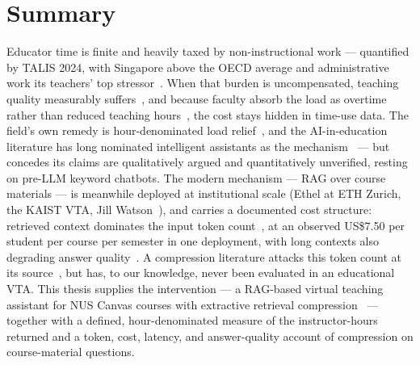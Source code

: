 \section{Summary}
\label{review:sec:summary}

Educator time is finite and heavily taxed by non-instructional work ---
quantified by TALIS 2024, with Singapore above the OECD average and
administrative work its teachers' top stressor~\cite{oecd25:TalisSG}. When
that burden is uncompensated, teaching quality measurably
suffers~\cite{apec15:GarciaGallego}, and because faculty absorb the load as
overtime rather than reduced teaching hours~\cite{wp07:Allgood}, the cost
stays hidden in time-use data. The field's own remedy is hour-denominated
load relief~\cite{aaup00:Workload}, and the AI-in-education literature has
long nominated intelligent assistants as the mechanism~\cite{sust22:Ahmad} ---
but concedes its claims are qualitatively argued and quantitatively
unverified, resting on pre-LLM keyword chatbots. The modern mechanism ---
RAG over course materials --- is meanwhile deployed at institutional scale
(Ethel at ETH Zurich, the KAIST VTA, Jill Watson~\cite{tpt24:Kortemeyer,
acl25:Kweon, arxiv24:JillWatson}), and carries a documented cost structure:
retrieved context dominates the input token count~\cite{femnlp23:Liu}, at an
observed US\$7.50 per student per course per semester in one deployment, with
long contexts also degrading answer quality~\cite{tacl24:Liu}. A compression
literature attacks this token count at its source~\cite{emnlp23:Li,
emnlp23:Jiang, acl24:Jiang, femnlp23:Liu, iclr24:Xu, facl25:Jeong}, but has,
to our knowledge, never been evaluated in an educational VTA. This thesis supplies the
intervention --- a RAG-based virtual teaching assistant for NUS Canvas courses
with extractive retrieval compression~\cite{neurips20:Lewis,
iclr24:Xu} --- together with a defined, hour-denominated measure of the
instructor-hours returned and a token, cost, latency, and answer-quality
account of compression on course-material questions.
